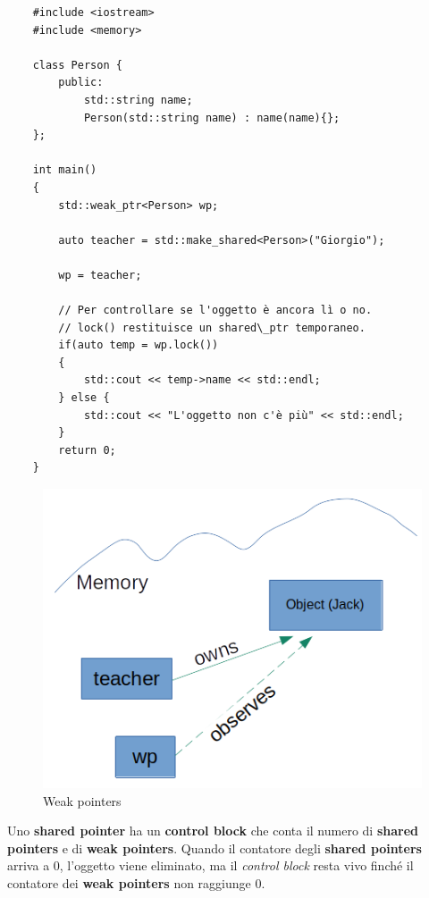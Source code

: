 \begin{lstlisting}
	#include <iostream>
	#include <memory>
	
	class Person {
		public:
			std::string name;
			Person(std::string name) : name(name){};
	};
	
	int main()
	{
		std::weak_ptr<Person> wp;
		
		auto teacher = std::make_shared<Person>("Giorgio");
		
		wp = teacher;
		
		// Per controllare se l'oggetto è ancora lì o no.
		// lock() restituisce un shared\_ptr temporaneo.
		if(auto temp = wp.lock())
		{
			std::cout << temp->name << std::endl;
		} else {
			std::cout << "L'oggetto non c'è più" << std::endl;
		}
		return 0;
	}
\end{lstlisting}

\begin{figure}[H]
	\centering
	\includegraphics[width=1\textwidth, height=1\textheight, keepaspectratio]{./imgs/weak_ptr1.png}
	\caption{Weak pointers}
	\label{fig:weak_ptr1}
\end{figure}

\textsf{\small Uno \textbf{shared pointer} ha un \textbf{control block} che conta il numero di \textbf{shared pointers} e di \textbf{weak pointers}. Quando il contatore degli \textbf{shared pointers} arriva a 0, l'oggetto viene eliminato, ma il \emph{control block} resta vivo finché il contatore dei \textbf{weak pointers} non raggiunge 0.} \\


